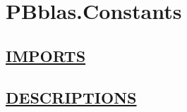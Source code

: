 \chapter*{PBblas.Constants}
\hypertarget{ecldoc:toc:PBblas.Constants}{}

\section*{\underline{IMPORTS}}

\section*{\underline{DESCRIPTIONS}}
